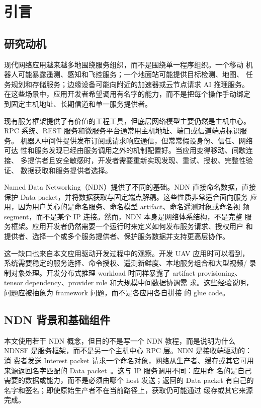 \chapter{引言}
\label{chap:introduction-ch}

\section{研究动机}

现代网络应用越来越多地围绕服务组织，而不是围绕单一程序组织。一个移动
机器人可能暴露遥测、感知和飞控服务；一个地面站可能提供目标检测、地图、
任务规划和存储服务；边缘设备可能向附近的加速器或云节点请求 AI 推理服务。
在这些场景中，应用开发者希望调用有名字的能力，而不是把每个操作手动绑定
到固定主机地址、长期信道和单一服务提供者。

现有服务框架提供了有价值的工程工具，但底层网络模型主要仍然是主机中心。
RPC 系统、REST 服务和微服务平台通常用主机地址、端口或信道端点标识服务。
机器人中间件提供发布订阅或请求响应通信，但常常假设身份、信任、网络可达
性和服务发现已经由服务调用之外的机制配置好。当应用变得移动、间歇连接、
多提供者且安全敏感时，开发者需要重新实现发现、重试、授权、完整性验证、
数据获取和服务提供者选择。

Named Data Networking（NDN）提供了不同的基础。NDN 直接命名数据，直接
保护 Data packet，并将数据获取与固定端点解耦。这些性质非常适合面向服务
应用，因为用户关心的是命名服务、命名模型 artifact、命名遥测对象或命名视
频 segment，而不是某个 IP 连接。然而，NDN 本身是网络体系结构，不是完整
服务框架。应用开发者仍然需要一个运行时来定义如何发布服务请求、授权用户
和提供者、选择一个或多个服务提供者、保护服务数据并支持更高层协作。

这一缺口也来自本文应用驱动开发过程中的观察。开发 UAV 应用时可以看到，
系统需要稳定的服务选择、命令授权、遥测新鲜度、本地服务组合和大型视频/
录制对象处理。开发分布式推理 workload 时同样暴露了 artifact
provisioning、tensor dependency、provider role 和大规模中间数据协调需
求。这些经验说明，问题应被抽象为 framework 问题，而不是各应用各自拼接
的 glue code。

\section{NDN 背景和基础组件}

本文使用若干 NDN 概念，但目的不是写一个 NDN 教程，而是说明为什么
NDNSF 是服务框架，而不是另一个主机中心 RPC 层。NDN 是接收端驱动的：消
费者发送 Interest packet 请求一个命名对象，网络从生产者、缓存或其它可用
来源返回名字匹配的 Data packet~\cite{ndn}。这与 IP 服务调用不同：应用命
名的是自己需要的数据或能力，而不是必须由哪个 host 发送；返回的 Data
packet 有自己的名字和签名；即使原始生产者不在当前路径上，获取仍可能通过
缓存或其它来源完成。

